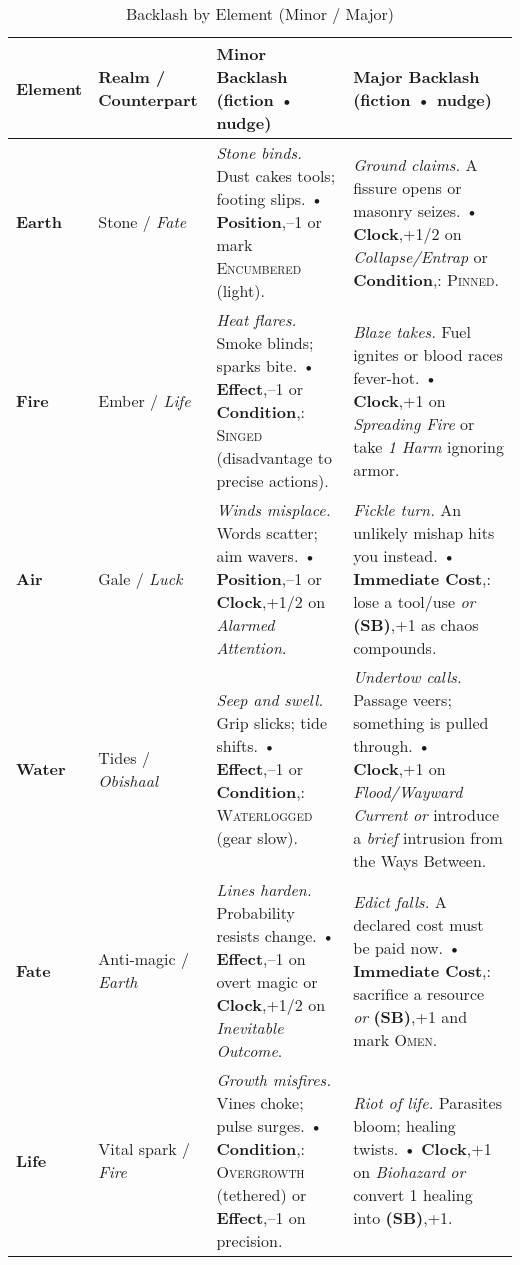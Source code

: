 \begin{table}[h]
\centering
\caption{Backlash by Element (Minor / Major)}
\label{tab:backlash-8x2}
\renewcommand{\arraystretch}{1.12}
\begin{tabularx}{\linewidth}{>{\bfseries}l l >{\raggedright}X >{\raggedright}X}
\toprule
Element & Realm / Counterpart & Minor Backlash (fiction • nudge) & Major Backlash (fiction • nudge) \\
\midrule
Earth & Stone / \emph{Fate} & \emph{Stone binds.} Dust cakes tools; footing slips. • \textbf{Position},–1 or mark \textsc{Encumbered} (light). & \emph{Ground claims.} A fissure opens or masonry seizes. • \textbf{Clock},+1/2 on \emph{Collapse/Entrap} or \textbf{Condition},: \textsc{Pinned}. \\
Fire & Ember / \emph{Life} & \emph{Heat flares.} Smoke blinds; sparks bite. • \textbf{Effect},–1 or \textbf{Condition},: \textsc{Singed} (disadvantage to precise actions). & \emph{Blaze takes.} Fuel ignites or blood races fever-hot. • \textbf{Clock},+1 on \emph{Spreading Fire} or take \emph{1 Harm} ignoring armor. \\
Air & Gale / \emph{Luck} & \emph{Winds misplace.} Words scatter; aim wavers. • \textbf{Position},–1 or \textbf{Clock},+1/2 on \emph{Alarmed Attention}. & \emph{Fickle turn.} An unlikely mishap hits you instead. • \textbf{Immediate Cost},: lose a tool/use \emph{or} \textbf{(SB)},+1 as chaos compounds. \\
Water & Tides / \emph{Obishaal} & \emph{Seep and swell.} Grip slicks; tide shifts. • \textbf{Effect},–1 or \textbf{Condition},: \textsc{Waterlogged} (gear slow). & \emph{Undertow calls.} Passage veers; something is pulled through. • \textbf{Clock},+1 on \emph{Flood/Wayward Current} \emph{or} introduce a \emph{brief} intrusion from the Ways Between. \\
Fate & Anti-magic / \emph{Earth} & \emph{Lines harden.} Probability resists change. • \textbf{Effect},–1 on overt magic or \textbf{Clock},+1/2 on \emph{Inevitable Outcome}. & \emph{Edict falls.} A declared cost must be paid now. • \textbf{Immediate Cost},: sacrifice a resource \emph{or} \textbf{(SB)},+1 and mark \textsc{Omen}. \\
Life & Vital spark / \emph{Fire} & \emph{Growth misfires.} Vines choke; pulse surges. • \textbf{Condition},: \textsc{Overgrowth} (tethered) or \textbf{Effect},–1 on precision. & \emph{Riot of life.} Parasites bloom; healing twists. • \textbf{Clock},+1 on \emph{Biohazard} \emph{or} convert 1 healing into \textbf{(SB)},+1. \\

\end{tabularx}
\end{table}
